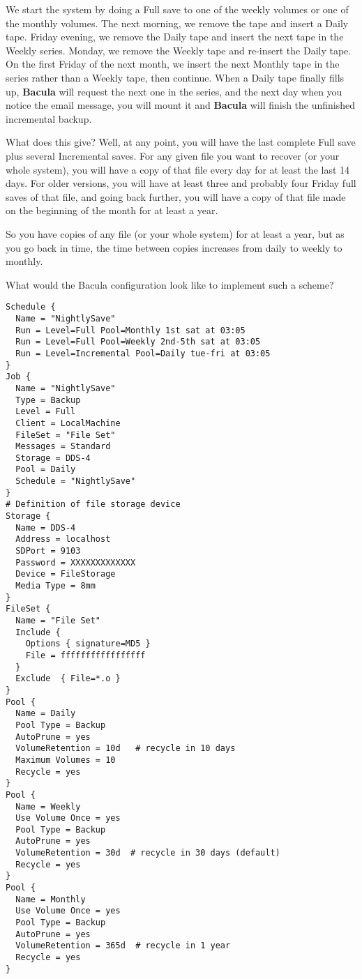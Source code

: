 We start the system by doing a Full save to one of the weekly volumes or one
of the monthly volumes. The next morning, we remove the tape and insert a
Daily tape. Friday evening, we remove the Daily tape and insert the next tape
in the Weekly series. Monday, we remove the Weekly tape and re-insert the
Daily tape. On the first Friday of the next month, we insert the next Monthly
tape in the series rather than a Weekly tape, then continue. When a Daily tape
finally fills up, {\bf Bacula} will request the next one in the series, and
the next day when you notice the email message, you will mount it and {\bf
Bacula} will finish the unfinished incremental backup. 

What does this give? Well, at any point, you will have the last complete
Full save plus several Incremental saves. For any given file you want to
recover (or your whole system), you will have a copy of that file every day
for at least the last 14 days. For older versions, you will have at least three
and probably four Friday full saves of that file, and going back further, you
will have a copy of that file made on the beginning of the month for at least
a year. 

So you have copies of any file (or your whole system) for at least a year, but
as you go back in time, the time between copies increases from daily to weekly
to monthly. 

What would the Bacula configuration look like to implement such a scheme? 

\footnotesize
\begin{verbatim}
Schedule {
  Name = "NightlySave"
  Run = Level=Full Pool=Monthly 1st sat at 03:05
  Run = Level=Full Pool=Weekly 2nd-5th sat at 03:05
  Run = Level=Incremental Pool=Daily tue-fri at 03:05
}
Job {
  Name = "NightlySave"
  Type = Backup
  Level = Full
  Client = LocalMachine
  FileSet = "File Set"
  Messages = Standard
  Storage = DDS-4
  Pool = Daily
  Schedule = "NightlySave"
}
# Definition of file storage device
Storage {
  Name = DDS-4
  Address = localhost
  SDPort = 9103
  Password = XXXXXXXXXXXXX
  Device = FileStorage
  Media Type = 8mm
}
FileSet {
  Name = "File Set"
  Include { 
    Options { signature=MD5 }
    File = fffffffffffffffff
  }
  Exclude  { File=*.o }
}
Pool {
  Name = Daily
  Pool Type = Backup
  AutoPrune = yes
  VolumeRetention = 10d   # recycle in 10 days
  Maximum Volumes = 10
  Recycle = yes
}
Pool {
  Name = Weekly
  Use Volume Once = yes
  Pool Type = Backup
  AutoPrune = yes
  VolumeRetention = 30d  # recycle in 30 days (default)
  Recycle = yes
}
Pool {
  Name = Monthly
  Use Volume Once = yes
  Pool Type = Backup
  AutoPrune = yes
  VolumeRetention = 365d  # recycle in 1 year
  Recycle = yes
}
\end{verbatim}
\normalsize

